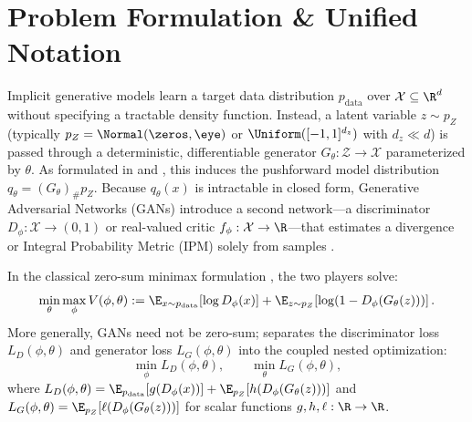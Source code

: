 \documentclass[../../../../master.tex]{subfiles}
\begin{document}
\setlength{\emergencystretch}{2.5em}

\section{Problem Formulation \& Unified Notation}
\label{sec:gan:formulation}

Implicit generative models learn a target data distribution $p_{\mathrm{data}}$ over $\mathcal{X} \subseteq \R^d$ without specifying a tractable density function. Instead, a latent variable $z \sim p_Z$ (typically $p_Z = \Normal(\zeros, \eye)$ or $\Uniform([-1,1]^{d_z})$ with $d_z \ll d$) is passed through a deterministic, differentiable generator $G_\theta : \mathcal{Z} \to \mathcal{X}$ parameterized by $\theta$. As formulated in  and , this induces the pushforward model distribution $q_\theta = (G_\theta)_\# p_Z$. Because $q_\theta(x)$ is intractable in closed form, Generative Adversarial Networks (GANs) introduce a second network---a discriminator $D_\phi : \mathcal{X} \to (0,1)$ or real-valued critic $f_\phi : \mathcal{X} \to \R$---that estimates a divergence or Integral Probability Metric (IPM) solely from samples .

In the classical zero-sum minimax formulation  , the two players solve:
\begin{equation}
  \label{eq:gan:minimax}
  \min_{\theta} \max_{\phi} V(\phi, \theta)
  := \E_{x \sim p_{\mathrm{data}}}\!\left[\log D_\phi(x)\right]
   + \E_{z \sim p_Z}\!\left[\log\!\left(1 - D_\phi(G_\theta(z))\right)\right].
\end{equation}
More generally, GANs need not be zero-sum;  separates the discriminator loss $L_D(\phi, \theta)$ and generator loss $L_G(\phi, \theta)$ into the coupled nested optimization:
\begin{equation}
  \label{eq:gan:general_game}
  \min_{\phi} L_D(\phi, \theta), \qquad \min_{\theta} L_G(\phi, \theta),
\end{equation}
where $L_D(\phi, \theta) = \E_{p_{\mathrm{data}}}[g(D_\phi(x))] + \E_{p_Z}[h(D_\phi(G_\theta(z)))]$ and $L_G(\phi, \theta) = \E_{p_Z}[\ell(D_\phi(G_\theta(z)))]$ for scalar functions $g, h, \ell : \R \to \R$.
\end{document}
